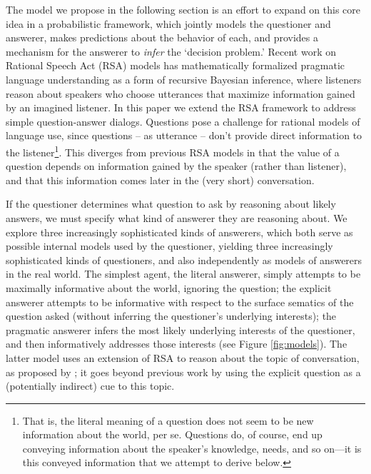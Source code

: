 \documentclass[12pt, floatsintext, jou]{apa6}
\begin{document}

The model we propose in the following section is an effort to expand on this core idea in a probabilistic framework, which jointly models the questioner and answerer, makes predictions about the behavior of each, and provides a mechanism for the answerer to \emph{infer} the `decision problem.'  Recent work on Rational Speech Act (RSA) models \cite{FrankGoodman12_PragmaticReasoningLanguageGames, GoodmanStuhlmuller13_KnowledgeImplicature} has mathematically formalized pragmatic language understanding as a form of recursive Bayesian inference, where listeners reason about speakers who choose utterances that maximize information gained by an imagined listener.
In this paper we extend the RSA framework to address simple question-answer dialogs.
Questions pose a challenge for rational models of language use, since questions -- as utterance -- don't provide direct information to the listener\footnote{That is, the literal meaning of a question does not seem to be new information about the world, per se. Questions do, of course, end up conveying information about the speaker's knowledge, needs, and so on---it is this conveyed information that we attempt to derive below.}. This diverges from previous RSA models in that the value of a question depends on information gained by the speaker (rather than listener), and that this information comes later in the (very short) conversation.

If the questioner determines what question to ask by reasoning about likely answers, we must specify what kind of answerer they are reasoning about. We explore three increasingly sophisticated kinds of answerers, which both serve as possible internal models used by the questioner, yielding three increasingly sophisticated kinds of questioners, and also independently as models of answerers in the real world. The simplest agent, the literal answerer, simply attempts to be maximally informative about the world, ignoring the question;   
the explicit answerer attempts to be informative with respect to the surface sematics of the question asked (without inferring the questioner's underlying interests);  
the pragmatic answerer infers the most likely underlying interests of the questioner, and then informatively addresses those interests (see Figure \ref{fig:models}).
The latter model uses an extension of RSA to reason about the topic of conversation, as proposed by ; it goes beyond previous work by using the explicit question as a (potentially indirect) cue to this topic. 
\end{document}

